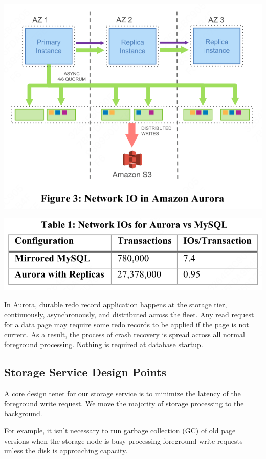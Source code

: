 \documentclass[11pt]{article}
\begin{document}
\begin{center}
\includegraphics[width=.7\textwidth]{../../images/papers/47.png}
\label{}
\end{center}

\begin{center}
\includegraphics[width=.7\textwidth]{../../images/papers/48.png}
\label{}
\end{center}

In Aurora, durable redo record application happens at the storage tier, continuously, asynchronously,
and distributed across the fleet. Any read request for a data page may require some redo records to be
applied if the page is not current. As a result, the process of crash recovery is spread across all
normal foreground processing. Nothing is required at database startup.
\subsection{Storage Service Design Points}
\label{sec:orgb6bdd3c}
A core design tenet for our storage service is to minimize the latency of the foreground write
request. We move the majority of storage processing to the background.

For example, it isn’t necessary to run garbage collection (GC) of old page versions when the storage
node is busy processing foreground write requests unless the disk is approaching capacity.
\end{document}
